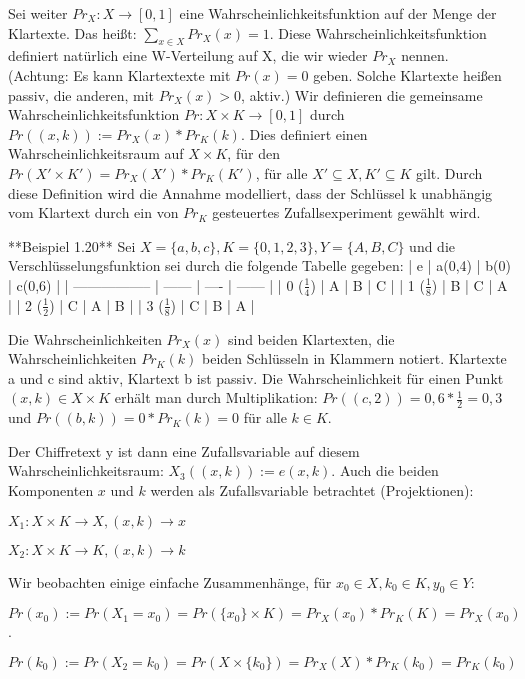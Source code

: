 \documentclass[a4paper]{article}
\begin{document}
\begin{multicols}{3}
    Sei weiter $Pr_X:X\rightarrow [0,1]$ eine Wahrscheinlichkeitsfunktion auf der Menge der Klartexte. Das heißt: $\sum_{x\in X}Pr_X(x)=1$. Diese Wahrscheinlichkeitsfunktion definiert natürlich eine W-Verteilung auf X, die wir wieder $Pr_X$ nennen. (Achtung: Es kann Klartextexte mit $Pr(x)=0$ geben. Solche Klartexte heißen passiv, die anderen, mit $Pr_X(x)>0$, aktiv.) Wir definieren die gemeinsame Wahrscheinlichkeitsfunktion $Pr:X\times K\rightarrow [0,1]$ durch $Pr((x,k)):=Pr_X(x)*Pr_K(k)$.
    Dies definiert einen Wahrscheinlichkeitsraum auf $X\times K$, für den $Pr(X'\times K')=Pr_X(X')*Pr_K(K')$, für alle $X'\subseteq X,K'\subseteq K$ gilt. Durch diese Definition wird die Annahme modelliert, dass der Schlüssel k unabhängig vom Klartext durch ein von $Pr_K$ gesteuertes Zufallsexperiment gewählt wird.

    **Beispiel 1.20** Sei $X=\{a,b,c\},K=\{0,1,2,3\},Y=\{A,B,C\}$ und die Verschlüsselungsfunktion sei durch die folgende Tabelle gegeben:
    | e                 | a(0,4) | b(0) | c(0,6) |
    | ----------------- | ------ | ---- | ------ |
    | 0 ($\frac{1}{4}$) | A      | B    | C      |
    | 1 ($\frac{1}{8}$) | B      | C    | A      |
    | 2 ($\frac{1}{2}$) | C      | A    | B      |
    | 3 ($\frac{1}{8}$) | C      | B    | A      |

    Die Wahrscheinlichkeiten $Pr_X(x)$ sind beiden Klartexten, die Wahrscheinlichkeiten $Pr_K(k)$ beiden Schlüsseln in Klammern notiert. Klartexte a und c sind aktiv, Klartext b ist passiv. Die Wahrscheinlichkeit für einen Punkt $(x,k)\in X\times K$ erhält man durch Multiplikation: $Pr((c,2)) = 0,6 *\frac{1}{2}=0,3$ und $Pr((b,k))=0*Pr_K(k)=0$ für alle $k\in K$.

    Der Chiffretext y ist dann eine Zufallsvariable auf diesem Wahrscheinlichkeitsraum: $X_3((x,k)):=e(x,k)$.
    Auch die beiden Komponenten $x$ und $k$ werden als Zufallsvariable betrachtet (Projektionen):
    \begin{itemize*}
        \item $X_1:X\times K\rightarrow X,(x,k) \rightarrow x$
        \item $X_2:X\times K\rightarrow K,(x,k) \rightarrow k$
    \end{itemize*}

    Wir beobachten einige einfache Zusammenhänge, für $x_0\in X,k_0\in K,y_0\in Y$:
    \begin{itemize*}
        \item $Pr(x_0):=Pr(X_1=x_0)=Pr(\{x_0\}\times K) = Pr_X(x_0)*Pr_K(K) = Pr_X(x_0)$.
        \item $Pr(k_0):=Pr(X_2=k_0)=Pr(X\times\{k_0\})=Pr_X(X)*Pr_K(k_0)=Pr_K(k_0)$
    \end{itemize*}


\end{multicols}
\end{document}
